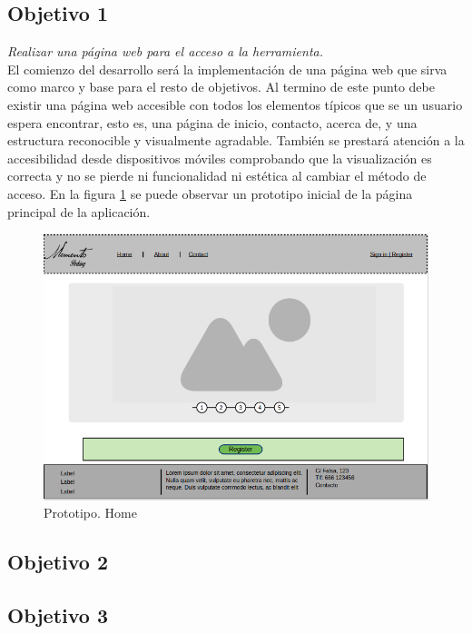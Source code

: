 \subsection{Objetivo 1}
\emph{Realizar una página web para el acceso a la herramienta.}\\
El comienzo del desarrollo será la implementación de una página web que sirva como marco y base para el resto de objetivos. Al termino de este punto debe existir una página web accesible con todos los elementos típicos que se un usuario espera encontrar, esto es, una página de inicio, contacto, acerca de, y una estructura reconocible y visualmente agradable. También se prestará atención a la accesibilidad desde dispositivos móviles comprobando que la visualización es correcta y no se pierde ni funcionalidad ni estética al cambiar el método de acceso. En la figura \ref{fig:prototipo_Home} se puede observar un prototipo inicial de la página principal de la aplicación.

\begin{figure}[hbtp]
\centering
\includegraphics[scale=0.5, fbox={\fboxrule} 4mm]{images/objetivos/prototipo_Home.png}
\caption{Prototipo. Home}
\label{fig:prototipo_Home}
\end{figure}

\subsection{Objetivo 2}

\subsection{Objetivo 3}


